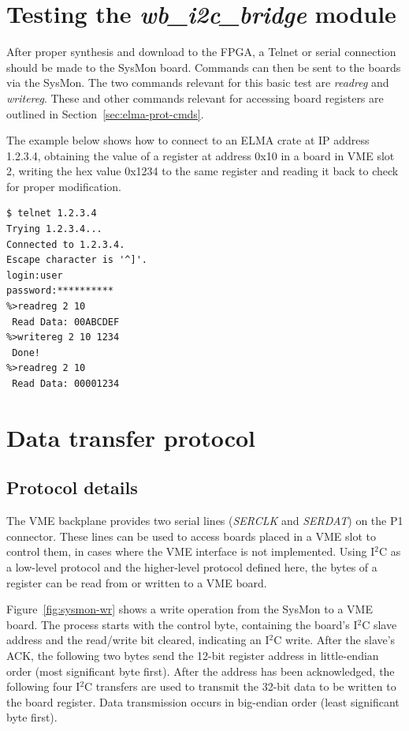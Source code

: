 \documentclass[a4paper,11pt]{article}
\begin{document}
\section{Testing the \textit{wb\_i2c\_bridge} module}
\label{sec:testing}

After proper synthesis and download to the FPGA, a Telnet or serial connection
should be made to the SysMon board. Commands can then be sent to the boards via
the SysMon. The two commands relevant for this basic test are \textit{readreg}
and \textit{writereg}. These and other commands relevant for accessing board
registers are outlined in Section~\ref{sec:elma-prot-cmds}.

The example below shows how to connect to an ELMA crate at IP address 1.2.3.4,
obtaining the value of a register at address 0x10 in a board in VME slot 2,
writing the hex value 0x1234 to the same register and reading it back to check for
proper modification.

\begin{verbatim}
$ telnet 1.2.3.4
Trying 1.2.3.4...
Connected to 1.2.3.4.
Escape character is '^]'.
login:user
password:**********
%>readreg 2 10
 Read Data: 00ABCDEF
%>writereg 2 10 1234
 Done!
%>readreg 2 10
 Read Data: 00001234
\end{verbatim}

\section{Data transfer protocol}
\label{sec:elma-prot}

\subsection{Protocol details}
\label{sec:elma-prot-prot}

The VME backplane provides two serial lines (\textit{SERCLK} and \textit{SERDAT})
on the P1 connector. These lines can be used to access boards placed in a VME
slot to control them, in cases where the VME interface is not implemented.
Using I$^2$C as a low-level protocol and the higher-level protocol defined here,
the bytes of a register can be read from or written to a VME board.

Figure~\ref{fig:sysmon-wr} shows a write operation from the SysMon to a VME
board. The process starts with the control byte, containing the board's
I$^2$C slave address and the read/write bit cleared, indicating an 
I$^2$C write. After the slave's ACK, the following two bytes send the 
12-bit register address in little-endian order (most significant byte first). 
After the address has been acknowledged, the following four I$^2$C transfers 
are used to transmit the 32-bit data to be written to the board register.
Data transmission occurs in big-endian order (least significant byte first).
\end{document}
